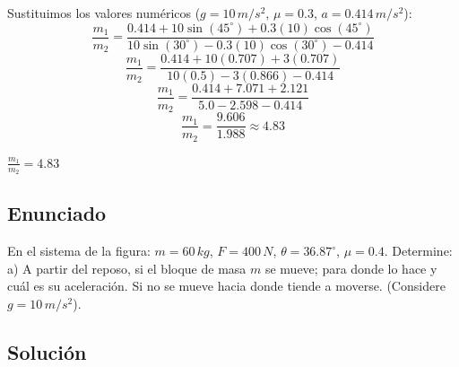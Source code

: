 \documentclass[12pt, a4paper]{article}
\begin{document}
Sustituimos los valores numéricos ($g = 10 \, \si{m/s^2}$, $\mu = 0.3$, $a = 0.414 \, \si{m/s^2}$):
$$ \frac{m_1}{m_2} = \frac{0.414 + 10 \sin(45^\circ) + 0.3(10) \cos(45^\circ)}{10 \sin(30^\circ) - 0.3(10) \cos(30^\circ) - 0.414} $$
$$ \frac{m_1}{m_2} = \frac{0.414 + 10(0.707) + 3(0.707)}{10(0.5) - 3(0.866) - 0.414} $$
$$ \frac{m_1}{m_2} = \frac{0.414 + 7.071 + 2.121}{5.0 - 2.598 - 0.414} $$
$$ \frac{m_1}{m_2} = \frac{9.606}{1.988} \approx 4.83 $$

\begin{tcolorbox}[colback=green!5!white, colframe=green!50!black, title=Respuesta Final]
\centering \Large $\frac{m_1}{m_2} = 4.83$
\end{tcolorbox}

\newpage

\subsection*{Enunciado}
En el sistema de la figura: $m = 60 \, \si{kg}$, $F = 400 \, \si{N}$, $\theta = 36.87^\circ$, $\mu = 0.4$. Determine:
a) A partir del reposo, si el bloque de masa $m$ se mueve; para donde lo hace y cuál es su aceleración. Si no se mueve hacia donde tiende a moverse. (Considere $g = 10 \, \si{m/s^2}$).

\begin{center}
\end{center}

\subsection*{Solución}
\end{document}
